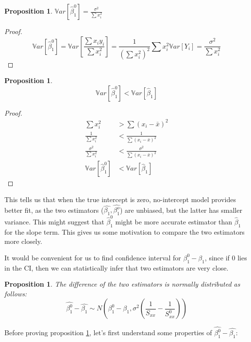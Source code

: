 \documentclass[12pt,a4paper,oneside]{book} %
\newtheorem{proposition}[theorem]{Proposition}
\begin{document}
	\begin{proposition} \label{prop:variance_slop_no_intercept}
		$\mathbb{V}ar[\hat{\beta}_1^0] = \frac{\sigma^2}{\sum x_i^2}$
	\end{proposition}


	\begin{proof}
		\[
		\mathbb{V}ar[\hat{\beta}_1^0] =  \mathbb{V}ar[\frac{\sum x_i y_i}{\sum x_i^2}] = \frac{1}{(\sum x_i^2)^2} \sum x_i^2 \mathbb{V}ar[Y_i] = \frac{\sigma^2}{\sum x_i^2}
		\]
	\end{proof}


	\begin{proposition} \label{prop:variance_no_intercept_is_lower}
		\[
			\mathbb{V}ar[\hat{\beta}_1^0] < \mathbb{V}ar[\hat{\beta}_1]
		\]
	\end{proposition}

	\begin{proof}
		\begin{align*}
			\sum x_i^2 &> \sum (x_i - \bar{x})^2  \\
			\frac{1}{\sum x_i^2}  &< \frac{1}{\sum (x_i - \bar{x})^2}  \\
			\frac{\sigma^2}{\sum x_i^2}  &< \frac{\sigma^2}{\sum (x_i - \bar{x})^2}  \\
			\mathbb{V}ar[\hat{\beta}_1^0] &< \mathbb{V}ar[\hat{\beta}_1] 
		\end{align*}
	\end{proof}

This tells us that when the true intercept is zero, no-intercept model provides better fit, as the two estimators ($\hat{\beta_1}, \hat{\beta_1^o}$) are unbiased, but the latter has smaller variance. 
This might suggest that $\hat{\beta}_1^0$ might be more accurate estimator than $\hat{\beta}_1$ for the slope term. This gives us some motivation to compare the two estimators more closely.

It would be convenient for us to find confidence interval for $\beta_1^0 - \beta_1$, since if 0 lies in the CI, then we can statistically infer that two estimators are very close.

\begin{proposition} \label{prop:normally}
	The difference of the two estimators is normally distributed as follows: 
	\[
		\hat{\beta_1^0}-\hat{\beta_1} \sim N(\beta_1^0-\beta_1, \sigma^2(\frac{1}{S_{xx}}-\frac{1}{S_{xx}^0}))
	\]
\end{proposition}

	Before proving proposition \ref{prop:normally}, let's first understand some properties of $\hat{\beta_1^0}-\hat{\beta_1}$:
\end{document}
